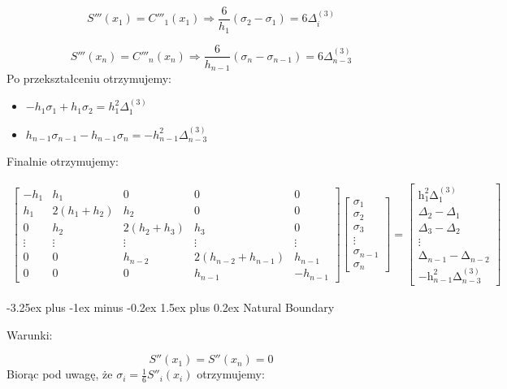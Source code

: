 \documentclass{article}
\makeatletter
\renewcommand{\paragraph}{\@startsection{paragraph}{4}{0ex}%
   {-3.25ex plus -1ex minus -0.2ex}%
   {1.5ex plus 0.2ex}%
   {\normalfont\normalsize\bfseries}}
\makeatother
\begin{document}
\[S'''(x_1) = C'''_1(x_1) \Rightarrow  \frac{6}{h_1}(\sigma_2-\sigma_1) = 6\Delta_i^{(3)}\]

\[S'''(x_n) = C'''_n(x_n) \Rightarrow  \frac{6}{h_{n-1}}(\sigma_n - \sigma_{n-1}) = 6\Delta_{n-3}^{(3)}\]
\noindent
Po przekształceniu otrzymujemy:

\begin{itemize}
\item \(-h_1\sigma_1 + h_1\sigma_2 = h_1^2\Delta_1^{(3)}\)
\item \(h_{n-1}\sigma_{n-1} - h_{n-1}\sigma_n = -h_{n-1}^2\Delta_{n-3}^{(3)}\)
\end{itemize}
\noindent
Finalnie otrzymujemy:

\begin{gather*}
\begin{bmatrix}
-h_1 & h_1 & 0 & 0 & 0 \\
h_1 & 2(h_1+h_2) & h_2 & 0 & 0 \\
0 & h_2 & 2(h_2+h_3) & h_3 & 0 \\
\vdots & \vdots & \vdots & \vdots & \vdots \\
0 & 0 & h_{n-2} & 2(h_{n-2} + h_{n-1}) & h_{n-1} \\
0 & 0 & 0 & h_{n-1} & -h_{n-1} 
\end{bmatrix}
\begin{bmatrix}
\sigma_1 \\
\sigma_2 \\
\sigma_3 \\
\vdots \\
\sigma_{n-1} \\
\sigma_n 
\end{bmatrix}
=
\begin{bmatrix}
\mathrm{h}_{1}^{2}\mathrm{\Delta}_{1}^{(3)} \\
\Delta_2 - \Delta_1 \\
\Delta_3 - \Delta_2 \\
\vdots \\
\mathrm{\Delta}_{n-1}^{} - \mathrm{\Delta}_{n-2}^{} \\
\mathrm{-h}_{n-1}^{2}\mathrm{\Delta}_{n-3}^{(3)} 
\end{bmatrix}
\end{gather*}

\paragraph{Natural Boundary}

Warunki:

\[S''(x_1) = S''(x_n) = 0\]
\noindent
Biorąc pod uwagę, że \(\sigma_i = \frac{1}{6}S''_i(x_i)\) otrzymujemy:
\end{document}
